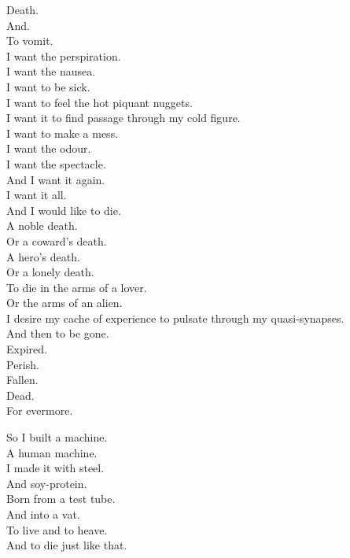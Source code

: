 Death. \\
And. \\
To vomit. \\

I want the perspiration. \\
I want the nausea. \\
I want to be sick. \\
I want to feel the hot piquant nuggets. \\
I want it to find passage through my cold figure. \\
I want to make a mess. \\
I want the odour. \\
I want the spectacle. \\
And I want it again. \\
I want it all. \\

And I would like to die. \\
A noble death. \\
Or a coward's death. \\
A hero's death. \\
Or a lonely death. \\
To die in the arms of a lover. \\
Or the arms of an alien. \\
I desire my cache of experience to pulsate through my quasi-synapses. \\
And then to be gone. \\
Expired. \\
Perish. \\
Fallen. \\
Dead. \\
For evermore. \\





So I built a machine. \\
A human machine. \\
I made it with steel. \\
And soy-protein. \\

Born from a test tube. \\
And into a vat. \\
To live and to heave. \\
And to die just like that. \\

